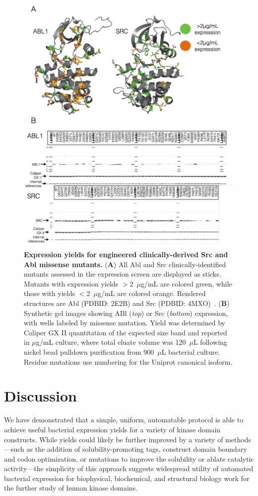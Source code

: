 \documentclass[phd,tocprelim]{cornell}
\begin{document}
\begin{landscape}
	\begin{figure}[p]
		\centering
		\includegraphics[width=0.5\linewidth]{figures/96-mutants-finalfigure.pdf}
		\caption[Expression yields for engineered clinically-derived Src and Abl missense mutants]{{\bf Expression yields for engineered clinically-derived Src and Abl missense mutants.}
			({\bf A}) All Abl and Src clinically-identified mutants assessed in the expression screen are displayed as sticks. 
			Mutants with expression yields $>$2~$\mu$g/mL are colored green, while those with yields $<$2~$\mu$g/mL are colored orange. 
			Rendered structures are Abl (PDBID: 2E2B) and Src (PDBID: 4MXO)~\citep{Levinson:2014gi}.
			({\bf B}) Synthetic gel images showing ABl (\emph{top}) or Src (\emph{bottom}) expression, with wells labeled by missense mutation.  
			Yield  was determined by Caliper GX II quantitation of the expected size band and reported in $\mu$g/mL culture, where total eluate volume was 120~$\mu$L following nickel bead pulldown purification from 900~$\mu$L bacterial culture.
			Residue mutations use numbering for the Uniprot canonical isoform.}
		\label{fig:96-mutant-fig}
	\end{figure}
\end{landscape}

\section{Discussion}
\label{section:discussion}

We have demonstrated that a simple, uniform, automatable protocol is able to achieve useful bacterial expression yields for a variety of kinase domain constructs.
While yields could likely be further improved by a variety of methods---such as the addition of solubility-promoting tags, construct domain boundary and codon optimization, or mutations to improve the solubility or ablate catalytic activity---the simplicity of this approach suggests widespread utility of automated bacterial expression for biophysical, biochemical, and structural biology work for the further study of human kinase domains.
\end{document}
